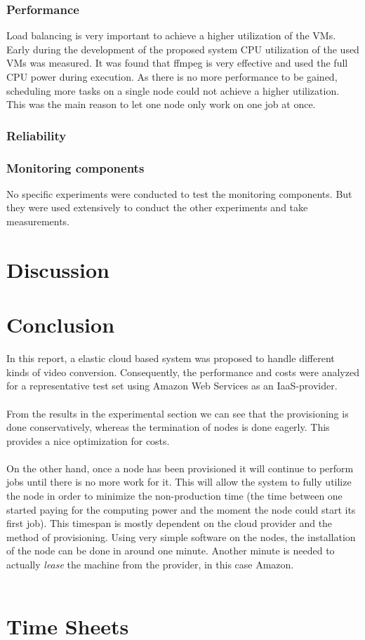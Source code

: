 \documentclass[a4paper]{IEEEtran}
\begin{document}
\subsubsection{Performance}
Load balancing is very important to achieve a higher utilization of the VMs.
Early during the development of the proposed system CPU utilization of the used VMs was measured.
It was found that ffmpeg is very effective and used the full CPU power during execution.
As there is no more performance to be gained, scheduling more tasks on a single node could not achieve a higher utilization.
This was the main reason to let one node only work on one job at once.

\subsubsection{Reliability}

\subsubsection{Monitoring components}
No specific experiments were conducted to test the monitoring components.
But they were used extensively to conduct the other experiments and take measurements.

\section{Discussion}

\section{Conclusion}

In this report, a elastic cloud based system was proposed to handle different kinds of video conversion.
Consequently, the performance and costs were analyzed for a representative test set using Amazon Web Services as an IaaS-provider.
\\
\\
From the results in the experimental section we can see that the provisioning is done conservatively, whereas the termination of nodes is done eagerly.
This provides a nice optimization for costs.
\\
\\
On the other hand, once a node has been provisioned it will continue to perform jobs until there is no more work for it. 
This will allow the system to fully utilize the node in order to minimize the non-production time (the time between one started paying for the computing power and the moment the node could start its first job).
This timespan is mostly dependent on the cloud provider and the method of provisioning.
Using very simple software on the nodes, the installation of the node can be done in around one minute.
Another minute is needed to actually \textit{lease} the machine from the provider, in this case Amazon.
\\
\\






\appendix
\section{Time Sheets}
\end{document}
